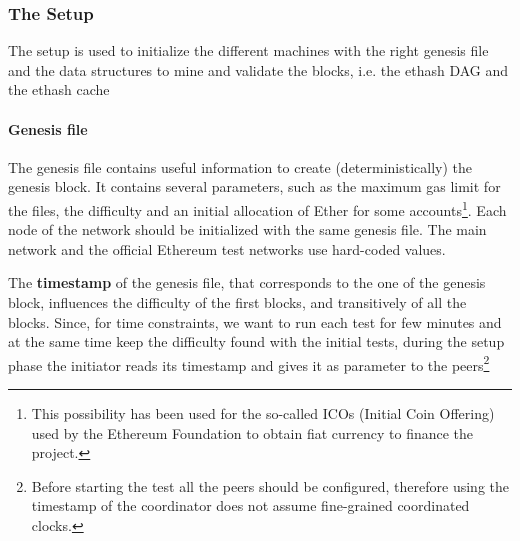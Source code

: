 \subsubsection{The Setup}
The setup is used to initialize the different machines with the right genesis
file and the data structures to mine and validate the blocks,  i.e.
the ethash DAG and the ethash cache

\paragraph{Genesis file}

The genesis file contains useful information to create (deterministically)
the genesis block. It contains several parameters, such as the maximum
gas limit for the files, the difficulty and an initial allocation of Ether
for some accounts\footnote{This possibility has been used for the so-called
ICOs (Initial Coin Offering) used by the Ethereum Foundation to obtain fiat
currency to finance the project.}. Each node of the network should be 
initialized with the same genesis file. 
The main network and the official Ethereum test
networks use hard-coded values.

The \textbf{timestamp} of the genesis file, that corresponds to the one of the genesis
block, influences the difficulty of the first blocks, and transitively
of all the blocks.
Since, for time constraints, we want to run each test for few minutes and
at the same time keep the difficulty found with the initial tests,
during the setup phase the initiator reads its timestamp and gives it
as parameter to the peers\footnote{Before starting the test all the
peers should be configured, therefore using the timestamp of the coordinator
does not assume fine-grained coordinated clocks.}

